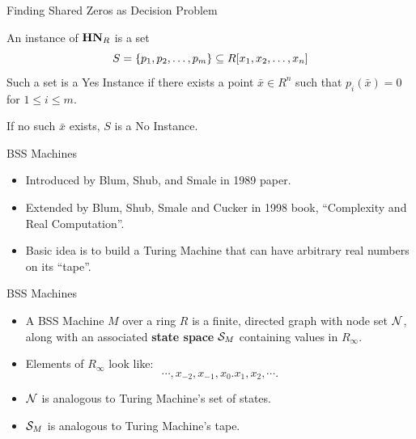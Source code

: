 \documentclass[c]{beamer}
\begin{document}
\begin{frame}{Finding Shared Zeros as Decision Problem}

  An instance of $\mathbf{HN}_R$ is a set 
  $$S = \{p_1, p_2, \ldots, p_m\} \subseteq R[x_1, x_2,\ldots,x_n]$$ 
  Such a set is a Yes Instance if there exists a point $\bar{x} \in
  R^n$ such that $p_i(\bar{x}) = 0$ for $1 \leq i \leq m$.

  \vspace{\baselineskip}
  
  If no such $\bar{x}$ exists, $S$ is a No Instance.
  
\end{frame}

\begin{frame}{BSS Machines}

  \begin{itemize}
  \item[] Introduced by Blum, Shub, and Smale in 1989 paper.

    \vspace{\baselineskip}

  \item[] Extended by Blum, Shub, Smale and Cucker in 1998 book,
    ``Complexity and Real Computation''.

    \vspace{\baselineskip}

  \item[] Basic idea is to build a Turing Machine that can have
    arbitrary real numbers on its ``tape''.
  \end{itemize}
\end{frame}

\begin{frame}{BSS Machines}

  \begin{itemize}
  \item A BSS Machine $M$ over a ring $R$ is a finite, directed graph
    with node set $\mathcal{N}$, along with an associated \textbf{state
      space} $\mathcal{S}_M$ containing values in $R_\infty$.
  \item Elements of $R_\infty$ look like:
    \vspace{-.8\baselineskip}
    $$\cdots, x_{-2}, x_{-1}, x_0 . x_1, x_2, \cdots.$$
    \vspace{-\baselineskip}\pause
  \item $\mathcal{N}$ is analogous to Turing Machine's set of
    states.
  \item $\mathcal{S}_M$ is analogous to Turing Machine's tape.
  \end{itemize}

\end{frame}
\end{document}
